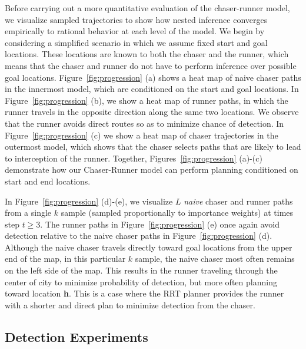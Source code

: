 \documentclass{article}
\begin{document}
Before carrying out a more quantitative evaluation of the chaser-runner model, we visualize sampled trajectories to show how nested inference converges empirically to rational behavior at each level of the model. 
We begin by considering a simplified scenario in which we assume fixed start and goal locations. These locations are known to both the chaser and the runner, which means that the chaser and runner do not have to perform inference over possible goal locations.
Figure~\ref{fig:progression} (a) shows a heat map of naive chaser paths in the innermost model, which are conditioned on the start and goal locations. In Figure~\ref{fig:progression} (b), we show a heat map of runner paths, in which the runner travels in the opposite direction along the same two locations. We observe that the runner avoids direct routes so as to minimize chance of detection. In Figure~\ref{fig:progression} (c) we show a heat map of chaser trajectories in the outermost model, which shows that the chaser selects paths that are likely to lead to interception of the runner. Together, Figures~\ref{fig:progression} (a)-(c) demonstrate how our Chaser-Runner model can perform planning conditioned on start and end locations.

In Figure~\ref{fig:progression} (d)-(e), we visualize $L$ \textit{naive} chaser and runner paths from a single $k$ sample (sampled proportionally to importance weights) at times step $t\ge3$. 
The runner paths in Figure~\ref{fig:progression} (e) once again avoid detection relative to the naive chaser paths in Figure~\ref{fig:progression} (d). Although the naive chaser travels directly toward goal locations from the upper end of the map, in this particular $k$ sample, the naive chaser most often remains on the left side of the map. This results in the runner traveling through the center of city to minimize probability of detection, but more often planning toward location \textbf{h}.  This is a case where the RRT planner provides the runner with  a shorter and direct plan to minimize detection from the chaser. 







\vspace{-0.25em}
\subsection{Detection Experiments}
\vspace{-0.25em}
\end{document}
